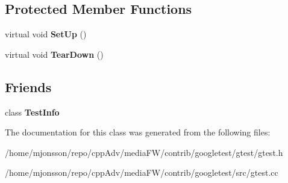 \subsection*{Protected Member Functions}
\begin{DoxyCompactItemize}
\item 
\mbox{\label{classtesting_1_1Test_a57a4116f39f6636a80710ded7d42e889}} 
virtual void {\bfseries Set\+Up} ()
\item 
\mbox{\label{classtesting_1_1Test_a2889fd829b6c712d98fb3896d28f64a3}} 
virtual void {\bfseries Tear\+Down} ()
\end{DoxyCompactItemize}
\subsection*{Friends}
\begin{DoxyCompactItemize}
\item 
\mbox{\label{classtesting_1_1Test_a4c49c2cdb6c328e6b709b4542f23de3c}} 
class {\bfseries Test\+Info}
\end{DoxyCompactItemize}


The documentation for this class was generated from the following files\+:\begin{DoxyCompactItemize}
\item 
/home/mjonsson/repo/cpp\+Adv/media\+F\+W/contrib/googletest/gtest/gtest.\+h\item 
/home/mjonsson/repo/cpp\+Adv/media\+F\+W/contrib/googletest/src/gtest.\+cc\end{DoxyCompactItemize}

